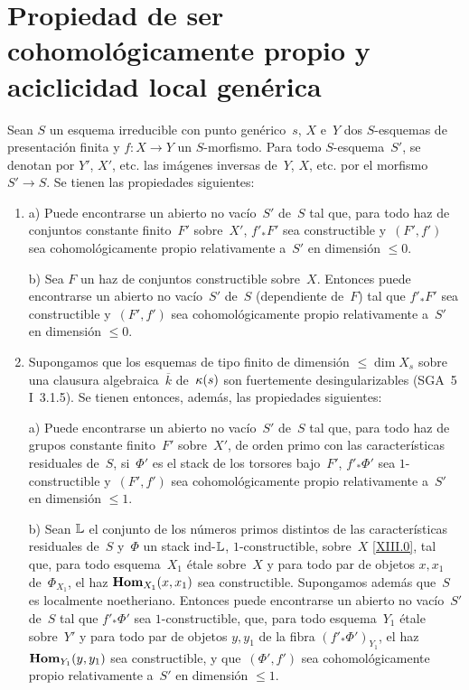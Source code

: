 
\section[Ser cohomológicamente propio y aciclicidad local]{Propiedad de ser cohomológicamente propio y aciclicidad local genérica}
\label{XIII.3}

\begin{theoreme}
\label{XIII.3.1}
Sean $S$ un esquema irreducible con punto genérico~$s$, $X$ e~$Y$ dos
$S$-esquemas de presentación finita y $f\colon X\to Y$ un
$S$-morfismo. Para todo $S$-esquema~$S'$, se denotan por $Y'$, $X'$, etc.
las imágenes inversas de~$Y$, $X$, etc. por el morfismo $S'\to S$.
Se tienen las propiedades siguientes:

\begin{enumerate}
\item[1)]
{\upshape a)} Puede encontrarse un abierto no vacío~$S'$ de~$S$ tal que,
para todo haz de conjuntos constante finito~$F'$ sobre~$X'$, $f'_*F'$ sea
constructible y~$(F',f')$ sea cohomológicamente propio relativamente
a~$S'$ en dimensión $\leqslant 0$.

{\upshape b)} Sea $F$ un haz de conjuntos constructible sobre~$X$.
Entonces puede encontrarse un abierto no vacío~$S'$ de~$S$ (dependiente
de~$F$) tal que $f'_*F'$ sea constructible y~$(F',f')$ sea
cohomológicamente propio relativamente a~$S'$ en dimensión
$\leqslant 0$.

\item[2)] Supongamos que los esquemas de tipo finito de dimensión
$\leqslant\dim X_s$ sobre una clausura algebraica~$\overline{k}$
de~$\kappa(s)$ son fuertemente desingularizables
\textup{(SGA~5 I~3.1.5)}. Se tienen entonces, además, las propiedades
siguientes:

{\upshape a)} Puede encontrarse un abierto no vacío~$S'$ de~$S$ tal que,
para todo haz de grupos constante finito~$F'$ sobre~$X'$, de orden primo
con las características residuales de~$S$, si~$\Phi'$ es el stack de los
torsores bajo~$F'$, $f'_*\Phi'$ sea $1$-constructible y~$(F',f')$ sea
cohomológicamente propio relativamente a~$S'$ en dimensión
$\leqslant 1$.

{\upshape b)} Sean $\mathbb L$ el conjunto de los números primos distintos de
las características residuales de~$S$ y~$\Phi$ un stack ind-$\mathbb L$,
$1$-constructible, sobre~$X$ \eqref{XIII.0}, tal que, para todo
esquema~$X_1$ étale sobre~$X$ y para todo par de objetos $x,x_1$
de~$\Phi_{X_1}$, el haz $\operatorname{\mathbf{Hom}}_{X_1}(x,x_1)$ sea constructible.
Supongamos además que~$S$ es localmente noetheriano. Entonces puede
encontrarse un abierto no vacío~$S'$ de~$S$ tal que $f'_*\Phi'$ sea
$1$-constructible, que,
{}
{para todo esquema~$Y_1$ étale sobre~$Y'$ y}
para todo par de objetos $y,y_1$ de la fibra $(f'_*\Phi')_{Y_1}$,
el haz $\operatorname{\mathbf{Hom}}_{Y_1}(y,y_1)$ sea constructible,
y que~$(\Phi',f')$ sea cohomológicamente propio relativamente a~$S'$
en dimensión $\leqslant 1$.
\end{enumerate}
\end{theoreme}

